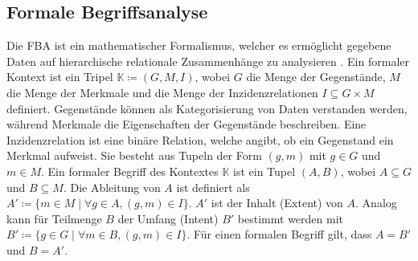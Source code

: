 \subsection{Formale Begriffsanalyse}
Die \ac{FBA} ist ein mathematischer Formalismus, welcher es ermöglicht gegebene Daten auf hierarchische relationale Zusammenhänge zu analysieren \cite{formale-begriffsanalyse, formal-concept-analysis-wille}.
Ein formaler Kontext ist ein Tripel $\mathbb{K} \coloneqq (G, M, I)$, wobei $G$ die Menge der Gegenstände, $M$ die Menge der Merkmale und die Menge der Inzidenzrelationen $I \subseteq G \times M$ definiert.
Gegenstände können als Kategorisierung von Daten verstanden werden, während Merkmale die Eigenschaften der Gegenstände beschreiben.
Eine Inzidenzrelation ist eine binäre Relation, welche angibt, ob ein Gegenstand ein Merkmal aufweist.
Sie besteht aus Tupeln der Form $(g,m)$ mit $g \in G$ und $m \in M$.
Ein formaler Begriff des Kontextes $\mathbb{K}$ ist ein Tupel $(A,B)$, wobei $A \subseteq G$ und $B \subseteq M$.
Die Ableitung von $A$ ist definiert als $A' \coloneqq \{m \in M \mid \forall g \in A, (g,m) \in I\}$.
$A'$ ist der Inhalt (Extent) von $A$.
Analog kann für Teilmenge $B$ der Umfang (Intent) $B'$ bestimmt werden mit $B' \coloneqq \{g \in G \mid \forall m \in B, (g,m) \in I\}$.
Für einen formalen Begriff gilt, dass $A = B'$ und $B = A'$.\\

\begin{center}
    \begin{table}[!ht]
        \centering
        \caption{Kreuztabelle - Nahrungsmittel}
        \label{table:fca-food}
    \end{table}
\end{center}

